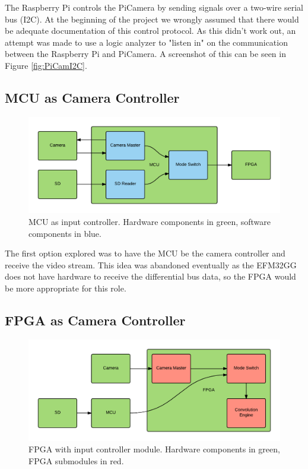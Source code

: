 The Raspberry Pi controls the PiCamera by sending signals over a two-wire serial bus (I2C).
At the beginning of the project we wrongly assumed that there would be adequate documentation of this control protocol.
As this didn't work out, an attempt was made to use a logic analyzer to "listen in" on the communication between the Raspberry Pi and PiCamera.
A screenshot of this can be seen in Figure \ref{fig:PiCamI2C}.

\subsection{MCU as Camera Controller}
\begin{figure}
    \centering
    \includegraphics[width=\linewidth]{img/MCU_CameraMaster}
    \caption{MCU as input controller. Hardware components in green, software components in blue.}
    \label{fig:MCU_CameraMaster}
\end{figure}

The first option explored was to have the MCU be the camera controller and receive the video stream.
This idea was abandoned eventually as the EFM32GG does not have hardware to receive the differential bus data,
so the FPGA would be more appropriate for this role.

\subsection{FPGA as Camera Controller}
\begin{figure}
    \centering
    \includegraphics[width=\linewidth]{img/FPGA_CameraMaster}
    \caption{FPGA with input controller module. Hardware components in green, FPGA submodules in red.}
    \label{fig:FPGA_CameraMaster}
\end{figure}

